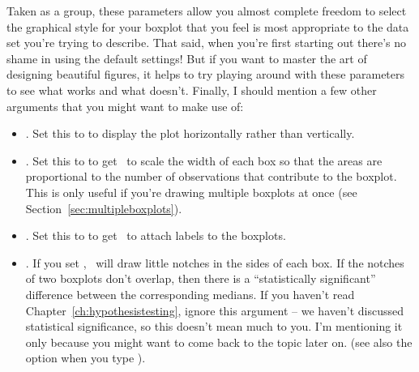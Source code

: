 Taken as a group, these parameters allow you almost complete freedom to select the graphical style for your boxplot that you feel is most appropriate to the data set you're trying to describe. That said, when you're first starting out there's no shame in using the default settings! But if you want to master the art of designing beautiful figures, it helps to try playing around with these parameters to see what works and what doesn't. Finally, I should mention a few  other arguments that you might want to make use of:
\begin{itemize} \itemsep 1pt
\item {}. Set this to  to display the plot horizontally rather than vertically.
\item {}. Set this to  to get \R\ to scale the width of each box so that the areas are proportional to the number of observations that contribute to the boxplot. This is only useful if you're drawing multiple boxplots at once (see Section~\ref{sec:multipleboxplots}).
\item {}. Set this to  to get \R\ to attach labels to the boxplots.
\item {}. If you set , \R\ will draw little notches in the sides of each box. If the notches of two boxplots don't overlap, then there is a ``statistically significant'' difference between the corresponding medians. If you haven't read Chapter~\ref{ch:hypothesistesting}, ignore this argument -- we haven't discussed statistical significance, so this doesn't mean much to you. I'm mentioning it only because you might want to come back to the topic later on. (see also the  option when you type ).
\end{itemize}




